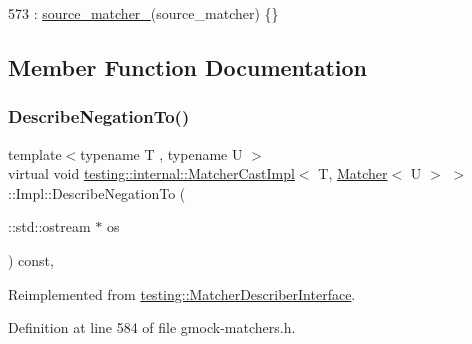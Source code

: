 \begin{DoxyCode}
573         : \hyperlink{classtesting_1_1internal_1_1MatcherCastImpl_3_01T_00_01Matcher_3_01U_01_4_01_4_1_1Impl_a812216395addd6e4bcfe54317ae42236}{source\_matcher\_}(source\_matcher) \{\}
\end{DoxyCode}


\subsection{Member Function Documentation}
\mbox{\label{classtesting_1_1internal_1_1MatcherCastImpl_3_01T_00_01Matcher_3_01U_01_4_01_4_1_1Impl_a2d363b3748fd1f4fd98372d1f4bfce4e}} 
\subsubsection{\texorpdfstring{Describe\+Negation\+To()}{DescribeNegationTo()}}
{\footnotesize\ttfamily template$<$typename T , typename U $>$ \\
virtual void \hyperlink{classtesting_1_1internal_1_1MatcherCastImpl}{testing\+::internal\+::\+Matcher\+Cast\+Impl}$<$ T, \hyperlink{classtesting_1_1Matcher}{Matcher}$<$ U $>$ $>$\+::Impl\+::\+Describe\+Negation\+To (\begin{DoxyParamCaption}\item[{\+::std\+::ostream $\ast$}]{os }\end{DoxyParamCaption}) const\hspace{0.3cm}{\ttfamily [inline]}, {\ttfamily [virtual]}}



Reimplemented from \hyperlink{classtesting_1_1MatcherDescriberInterface_a2071afbc47097c4d1c0064275af34db0}{testing\+::\+Matcher\+Describer\+Interface}.



Definition at line 584 of file gmock-\/matchers.\+h.


